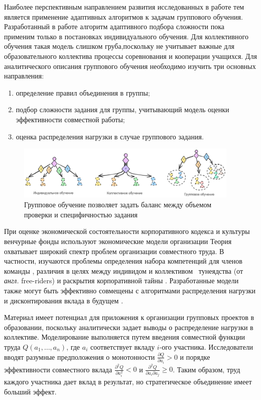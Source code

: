 Наиболее перспективным направлением развития исследованных в работе тем является применение адаптивных алгоритмов
к задачам группового обучения. Разработанный в работе алгоритм адаптивного подбора сложности пока применим 
только в постановках индивидуального обучения.
Для коллективного обучения такая модель слишком груба,поскольку не учитывает важные для образовательного 
коллектива процессы соревнования и
кооперации учащихся. Для аналитического описания группового обучения необходимо изучить три основных направления: \begin{enumerate}
    \item определение правил объединения в группы;
    \item подбор сложности задания для группы, учитывающий модель оценки эффективности совместной работы;
    \item оценка распределения нагрузки в случае группового задания.
\end{enumerate}

\begin{figure}[h]
    \centering
    \includegraphics[width=0.95\textwidth]{assets/final/setting.excalidraw.png}
    \caption{Групповое обучение позволяет задать баланс между объемом проверки и специфичностью задания}
    \label{group_learning}
\end{figure}

При оценке экономической состоятельности корпоративного кодекса и культуры
венчурные фонды используют экономические модели организации \cite{marschak1972economic}
Теория охватывает широкий спектр проблем организации совместного труда. В частности, изучаются проблемы 
определения набора компетенций для членов команды \cite{radner1962team},
различия в целях между индивидом и коллективом \cite{groves1973incentives}\, 
тунеядства (от \textit{англ.} free-riders) и раскрытия корпоративной тайны \cite{francis2005disclosure}.
Разработанные модели также могут быть эффективно совмещены с 
алгоритмами распределения нагрузки \cite{kuhn1955hungarian} и дисконтирования вклада в будущем \cite{nash1950bargaining}.

Материал имеет потенциал для приложения к организации групповых проектов в образовании, поскольку
аналитически задает выводы о распределение нагрузки в коллективе. Моделирование выполняется 
путем введения совместной функции труда $Q(a_1,\dots,a_n)$, где $a_i$ соответствует вкладу $i$-ого участника.
Исследователи вводят разумные предположения о монотонности $\frac{\partial Q}{\partial a_i} > 0$ и порядке 
эффективности совместного вклада $\frac{\partial^2 Q}{\partial a_i^2} < 0$ и $\frac{\partial^2 Q}{\partial a_i \partial a_j} \ge 0$.
Таким образом, труд каждого участника дает вклад в результат, но стратегическое объединение имеет больший эффект. 

